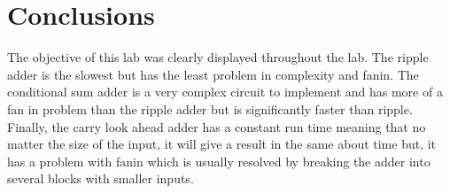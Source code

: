 \documentclass{article}\usepackage{graphicx} %
\begin{document}
\section{Conclusions}
The objective of this lab was clearly displayed throughout the lab. The ripple adder is the slowest but has the least problem in complexity and fanin. The conditional sum adder is a very complex circuit to implement and has more of a fan in problem than the ripple adder but is significantly faster than ripple. Finally,  the carry look ahead adder has a constant run time meaning that no matter the size of the input, it will give a result in the same about time but, it has a problem with fanin which is usually resolved by breaking the adder into several blocks with smaller inputs.
\end{document}
